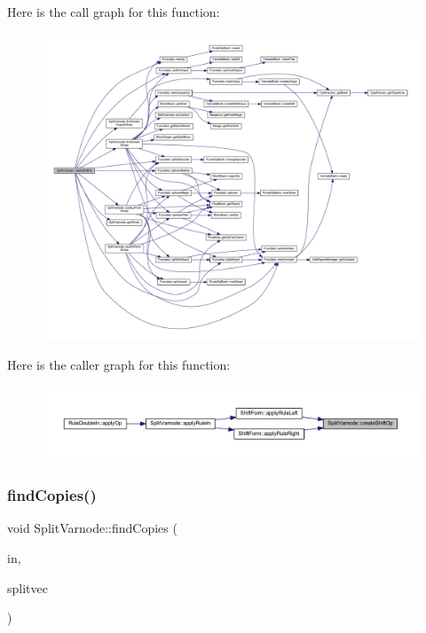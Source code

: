 Here is the call graph for this function\+:
\nopagebreak
\begin{figure}[H]
\begin{center}
\leavevmode
\includegraphics[width=350pt]{class_split_varnode_a106126352280623608ffbb571d25b387_cgraph}
\end{center}
\end{figure}
Here is the caller graph for this function\+:
\nopagebreak
\begin{figure}[H]
\begin{center}
\leavevmode
\includegraphics[width=350pt]{class_split_varnode_a106126352280623608ffbb571d25b387_icgraph}
\end{center}
\end{figure}
\mbox{\label{class_split_varnode_a565abf157db41c402ce92a365f51e600}} 
\subsubsection{\texorpdfstring{findCopies()}{findCopies()}}
{\footnotesize\ttfamily void Split\+Varnode\+::find\+Copies (\begin{DoxyParamCaption}\item[{const \mbox{\hyperlink{class_split_varnode}{Split\+Varnode}} \&}]{in,  }\item[{vector$<$ \mbox{\hyperlink{class_split_varnode}{Split\+Varnode}} $>$ \&}]{splitvec }\end{DoxyParamCaption})\hspace{0.3cm}{\ttfamily [static]}}



